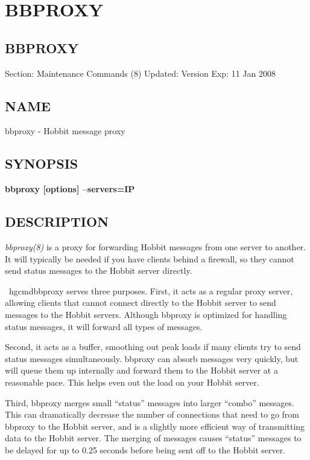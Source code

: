 



\chapter{BBPROXY}

\section{BBPROXY}
 Section: Maintenance Commands (8) 
Updated: Version Exp: 11 Jan 2008 
 
\section{NAME}
 bbproxy - Hobbit message proxy \section{SYNOPSIS}
\textbf{bbproxy [options] --servers=IP}

 
\section{DESCRIPTION}
\emph{bbproxy(8)}
 is a proxy for forwarding Hobbit messages from one server to another. It will typically be needed if you have clients behind a firewall, so they cannot send status messages to the Hobbit server directly. 

 ~\cite{web:patchutils}hgcmd{bbproxy} serves three purposes. First, it acts as a regular proxy server, allowing clients that cannot connect directly to the Hobbit server to send messages to the Hobbit servers. Although bbproxy is optimized for handling status messages, it will forward all types of messages.  



  Second, it acts as a buffer, smoothing out peak loads if many clients try to send status messages simultaneously. bbproxy can absorb messages very quickly, but will queue them up internally and forward them to the Hobbit server at a reasonable pace. This helps even out the load on your Hobbit server.  



  Third, bbproxy merges small ``status'' messages into larger ``combo'' messages. This can dramatically decrease the number of connections that need to go from bbproxy to the Hobbit server, and is a slightly more efficient way of transmitting data to the Hobbit server. The merging of messages causes ``status'' messages to be delayed for up to 0.25 seconds before being sent off to the Hobbit server. 


